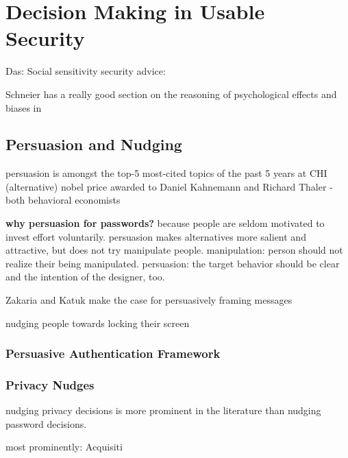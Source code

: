 
\chapter[Decision Making in Usable Security]{Decision Making in Usable Security}\label{chap:rw:persuasion}

Das: Social sensitivity security advice: \cite{Das2014EffectSocialInfluenceSecuritySensitivity}


	
	

Schneier has a really good section on the reasoning of psychological effects and biases in \cite{Schneier2008PsychologySecurity} 
	
	
\section{Persuasion and Nudging}

persuasion is amongst the top-5 most-cited topics of the past 5 years at CHI
(alternative) nobel price awarded to Daniel Kahnemann and Richard Thaler - both behavioral economists

\textbf{why persuasion for passwords?} because people are seldom motivated to invest effort voluntarily. persuasion makes alternatives more salient and attractive, but does not try manipulate people. manipulation: person should not realize their being manipulated. persuasion: the target behavior should be clear and the intention of the designer, too. 

\cite{Zakaria2013DesigningEffectiveSecurityMessages} Zakaria and Katuk make the case for persuasively framing messages


nudging people towards locking their screen \cite{Bruggen2013ModifiyngUnlockingBehavior}

	\subsection{Persuasive Authentication Framework}
	\subsection{Privacy Nudges}
	nudging privacy decisions is more prominent in the literature than nudging password decisions. 
	
	
	most prominently: Acquisiti \etal \cite{Acquisti2017NudgesPrivacySecurity} \cite{Acquisti2005PrivacyRationality}


